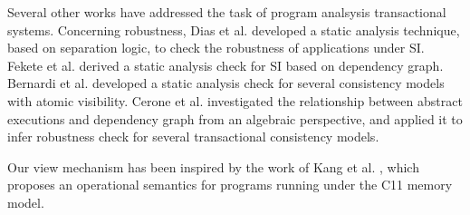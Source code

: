Several other works have addressed the task of program analsysis transactional systems. 
Concerning robustness, 
Dias et al. \cite{dias-tm} developed a static analysis technique, based on separation logic, 
to check the robustness of applications under SI. Fekete et al. \cite{fekete-tods} derived 
a static analysis check for SI based on dependency graph. Bernardi et al. \cite{giovanni-concur16} 
developed a static analysis check for several consistency models with atomic visibility. 
Cerone et al. \cite{laws} investigated the relationship between abstract 
executions and dependency graph from an algebraic perspective, and applied it to infer 
robustness check for several transactional consistency models. 

Our view mechanism has been inspired by the work of Kang et al. \cite{promises}, 
which proposes an operational semantics for programs running under the C11 memory model.